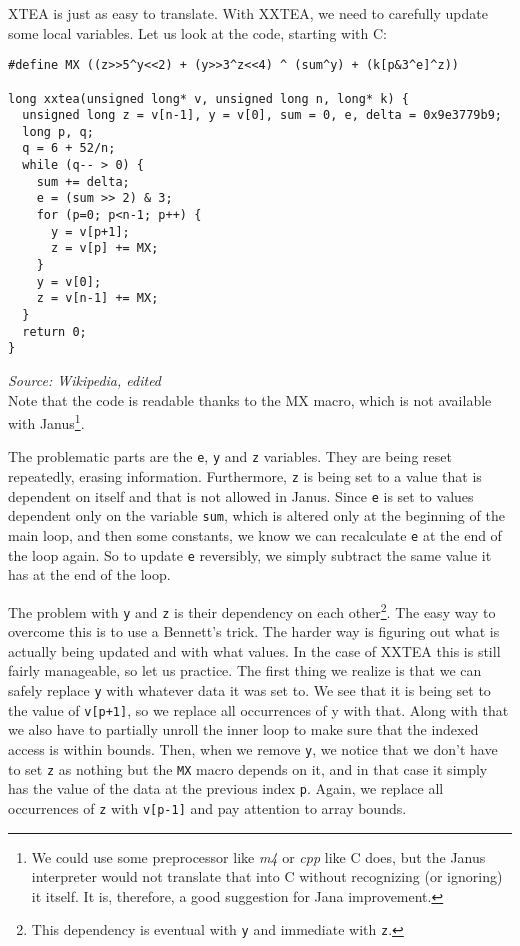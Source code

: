 \documentclass[a4paper,10pt,openright]{memoir}
\newcommand{\term}[1]{\textit{#1}}
\newcommand{\code}[1]{\texttt{#1}}
\begin{document}
XTEA is just as easy to translate. With XXTEA, we need to carefully 
update some local variables. Let us look at the code, starting with C:

\begin{lstlisting}
#define MX ((z>>5^y<<2) + (y>>3^z<<4) ^ (sum^y) + (k[p&3^e]^z))

long xxtea(unsigned long* v, unsigned long n, long* k) {
  unsigned long z = v[n-1], y = v[0], sum = 0, e, delta = 0x9e3779b9;
  long p, q;
  q = 6 + 52/n;
  while (q-- > 0) {
    sum += delta;
    e = (sum >> 2) & 3;
    for (p=0; p<n-1; p++) {
      y = v[p+1];
      z = v[p] += MX;
    }
    y = v[0];
    z = v[n-1] += MX;
  }
  return 0;
}
\end{lstlisting}
\textit{\footnotesize Source: Wikipedia, edited}\\

Note that the code is readable thanks to the MX macro, which is not 
available with Janus\footnote{We could use some preprocessor like 
\term{m4} or \term{cpp} like C does, but the Janus interpreter would 
not translate that into C without recognizing (or ignoring) it 
itself. It is, therefore, a good suggestion for Jana improvement.}.

The problematic parts are the \code{e}, \code{y} and \code{z} 
variables. They are being reset repeatedly, erasing information. 
Furthermore, \code{z} is being set to a value that is dependent on 
itself and that is not allowed in Janus. Since \code{e} is set to 
values dependent only on the variable \code{sum}, which is altered only 
at the beginning of the main loop, and then some constants, we know we 
can recalculate \code{e} at the end of the loop again. So to update 
\code{e} reversibly, we simply subtract the same value it has at the 
end of the loop.

The problem with \code{y} and \code{z} is their dependency on each 
other\footnote{This dependency is eventual with \code{y} and immediate 
with \code{z}.}. The easy way to overcome this is to use a Bennett's 
trick. The harder way is figuring out what is actually being updated 
and with what values. In the case of XXTEA this is still fairly 
manageable, so let us practice. The first thing we realize is that we 
can safely replace \code{y} with whatever data it was set to. We see 
that it is being set to the value of \code{v[p+1]}, so we replace all 
occurrences of y with that. Along with that we also have to partially 
unroll the inner loop to make sure that the indexed access is within 
bounds. Then, when we remove \code{y}, we notice that we don't have to 
set \code{z} as nothing but the \code{MX} macro depends on it, and in 
that case it simply has the value of the data at the previous index 
\code{p}. Again, we replace all occurrences of \code{z} with 
\code{v[p-1]} and pay attention to array bounds.
\end{document}
